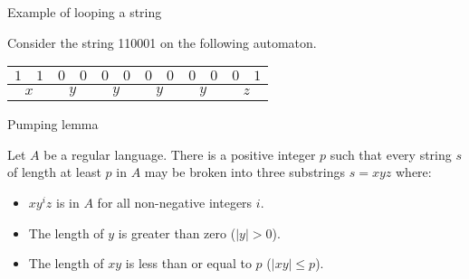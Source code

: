 \begin{frame}[fragile]{Example of looping a string}

  Consider the string 110001 on the following automaton.

  \begin{center}
  \end{center}

  \vspace{2mm}

  \begin{table}
  \begin{tabular}{|cc|cc|cc|cc|cc|cc|}
    \hline
    $1$ & $1$ & $0$ & $0$ & $0$ & $0$ & $0$ & $0$ & $0$ & $0$ & $0$ & $1$ \\
    \hline
    \multicolumn{2}{|c|}{$x$} &
    \multicolumn{2}{c|}{$y$} &
    \multicolumn{2}{c|}{$y$} &
    \multicolumn{2}{c|}{$y$} &
    \multicolumn{2}{c|}{$y$} &
    \multicolumn{2}{c|}{$z$} \\
    \hline
  \end{tabular}
\end{table}

\end{frame}


\begin{frame}{Pumping lemma}
  \begin{theorem}
    \vspace{2mm}
    Let $A$ be a regular language.
    There is a positive integer $p$ such that every string $s$ of length at least $p$ in $A$ may be broken into three substrings \( s = xyz \) where:

    \begin{itemize}
      \item \( xy^iz \) is in $A$ for all non-negative integers $i$.
      \item The length of $y$ is greater than zero ($|y| > 0$).
      \item The length of $xy$ is less than or equal to $p$ ($|xy| \leq p$).
    \end{itemize}
    \vspace{2mm}
  \end{theorem}

\end{frame}

